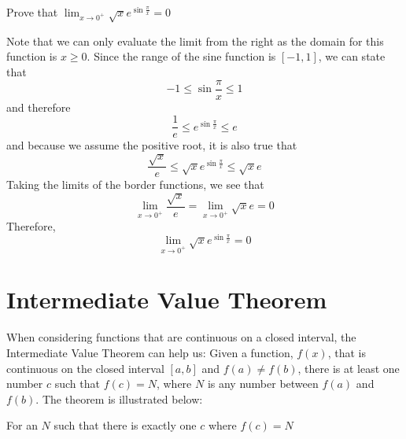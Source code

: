 \begin{Exercise}
    [title= Squeeze Theorem 3, label=squeeze3]
    Prove that $\lim_{x \to 0^+}\sqrt{x}e^{\sin{\frac{\pi}{x}}} = 0$
\end{Exercise}

\begin{Answer}
    [ref=squeeze3]
    Note that we can only evaluate the limit from the right as the domain for this function is $x \geq 0$. Since the range of the sine function is $[-1,1]$, we can state that $$-1 \leq \sin{\frac{\pi}{x}} \leq 1$$ 
    and therefore $$\frac{1}{e} \leq e^{\sin{\frac{\pi}{x}}} \leq e$$ and because we assume the positive root, it is also true that $$\frac{\sqrt{x}}{e} \leq \sqrt{x}e^{\sin{\frac{\pi}{x}}} \leq \sqrt{x}e$$ Taking the limits of the border functions, we see that $$\lim_{x \to 0^+}\frac{\sqrt{x}}{e} = \lim_{x \to 0^+}\sqrt{x}e = 0$$ Therefore, $$\lim_{x \to 0^+}\sqrt{x}e^{\sin{\frac{\pi}{x}}}=0$$
\end{Answer}


\section{Intermediate Value Theorem}
When considering functions that are continuous on a closed interval, the Intermediate Value Theorem can help us: Given a function, $f(x)$, that is continuous on the closed interval $\left[a, b\right]$ and $f(a) \neq f(b)$, there is at least one number $c$ such that $f(c) = N$, where $N$ is any number between $f(a)$ and $f(b)$. The theorem is illustrated below:

For an $N$ such that there is exactly one $c$ where $f(c) = N$



